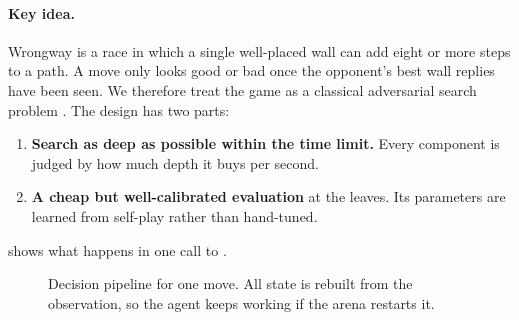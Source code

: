 \paragraph{Key idea.}
Wrongway is a race in which a single well-placed wall can add eight or more steps to a path.
A move only looks good or bad once the opponent's best wall replies have been seen.
We therefore treat the game as a classical adversarial search problem
\citep{knuth1975alphabeta}. The design has two parts:
\begin{enumerate}
  \item \textbf{Search as deep as possible within the time limit.} Every component is judged
        by how much depth it buys per second.
  \item \textbf{A cheap but well-calibrated evaluation} at the leaves. Its parameters are
        learned from self-play rather than hand-tuned.
\end{enumerate}
 shows what happens in one call to .

\begin{figure}[!htbp]
\centering
{}
\caption{Decision pipeline for one move. All state is rebuilt from the observation, so the agent
keeps working if the arena restarts it.}
\label{fig:pipeline}
\end{figure}

